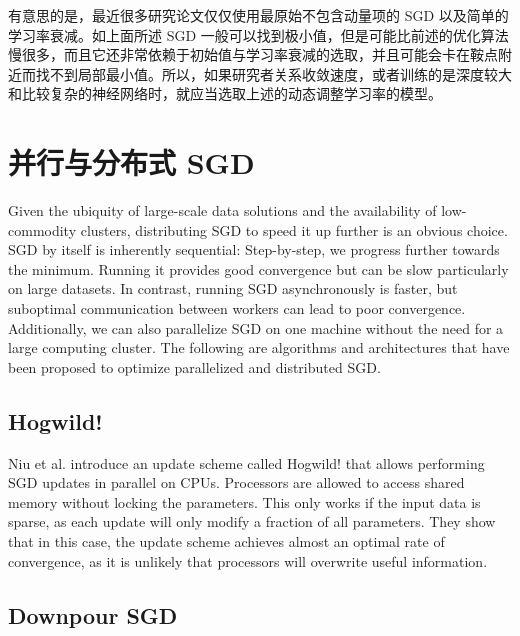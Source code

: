 \documentclass{article}
\begin{document}
有意思的是，最近很多研究论文仅仅使用最原始不包含动量项的 SGD 以及简单的学习率衰减。如上面所述 SGD 一般可以找到极小值，但是可能比前述的优化算法慢很多，而且它还非常依赖于初始值与学习率衰减的选取，并且可能会卡在鞍点附近而找不到局部最小值。所以，如果研究者关系收敛速度，或者训练的是深度较大和比较复杂的神经网络时，就应当选取上述的动态调整学习率的模型。

\section{并行与分布式 SGD} \label{sec:parallelizing}

Given the ubiquity of large-scale data solutions and the availability of low-commodity clusters, distributing SGD to speed it up further is an obvious choice.
SGD by itself is inherently sequential: Step-by-step, we progress further towards the minimum. Running it provides good convergence but can be slow particularly on large datasets. In contrast, running SGD asynchronously is faster, but suboptimal communication between workers can lead to poor convergence. Additionally, we can also parallelize SGD on one machine without the need for a large computing cluster. The following are algorithms and architectures that have been proposed to optimize parallelized and distributed SGD.



\subsection{Hogwild!}

Niu et al. \cite{Niu2011} introduce an update scheme called Hogwild! that allows performing SGD updates in parallel on CPUs. Processors are allowed to access shared memory without locking the parameters. This only works if the input data is sparse, as each update will only modify a fraction of all parameters. They show that in this case, the update scheme achieves almost an optimal rate of convergence, as it is unlikely that processors will overwrite useful information.

\subsection{Downpour SGD}
\end{document}
